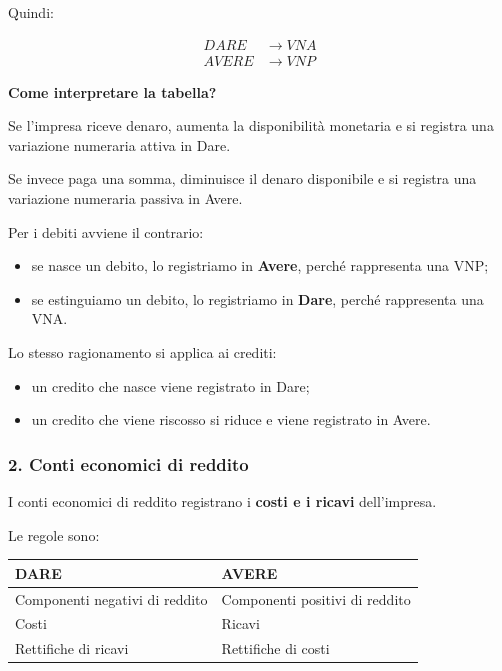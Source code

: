 \noindent Quindi:

\[
\boxed{
\begin{aligned}
DARE &\rightarrow VNA\\
AVERE &\rightarrow VNP
\end{aligned}
}
\]

\noindent \textbf{Come interpretare la tabella?}

\medskip

\noindent Se l'impresa riceve denaro, aumenta
la disponibilità monetaria e si registra
una variazione numeraria attiva in Dare.

\medskip

\noindent Se invece paga una somma, diminuisce
il denaro disponibile e si registra
una variazione numeraria passiva in Avere.

\medskip

\noindent Per i debiti avviene il contrario:

\begin{itemize}
    \item se nasce un debito, lo registriamo in
    \textbf{Avere}, perché rappresenta una VNP;

    \item se estinguiamo un debito, lo registriamo in
    \textbf{Dare}, perché rappresenta una VNA.
\end{itemize}

\noindent Lo stesso ragionamento si applica ai crediti:

\begin{itemize}
    \item un credito che nasce viene registrato in Dare;
    \item un credito che viene riscosso si riduce
    e viene registrato in Avere.
\end{itemize}


\subsubsection*{2. Conti economici di reddito}

\noindent I conti economici di reddito registrano
i \textbf{costi e i ricavi} dell'impresa.

\medskip

\noindent Le regole sono:

\begin{center}
\begin{tabular}{|l|l|}
\hline
\textbf{DARE} & \textbf{AVERE} \\
\hline
Componenti negativi di reddito &
Componenti positivi di reddito \\
\hline
Costi & Ricavi \\
\hline
Rettifiche di ricavi & Rettifiche di costi \\
\hline
\end{tabular}
\end{center}

